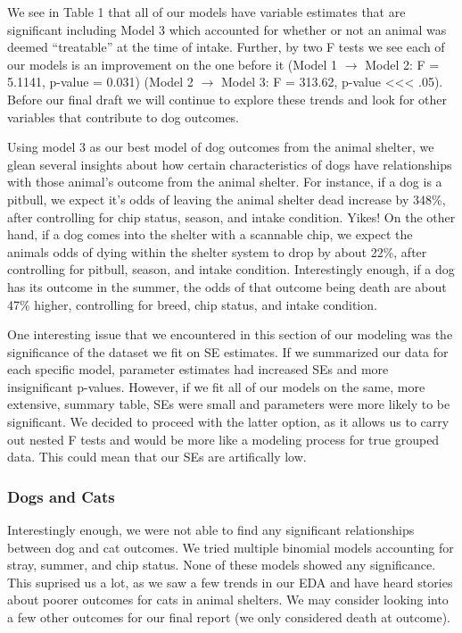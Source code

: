 \documentclass[]{article}
\begin{document}
We see in Table 1 that all of our models have variable estimates that
are significant including Model 3 which accounted for whether or not an
animal was deemed ``treatable'' at the time of intake. Further, by two F
tests we see each of our models is an improvement on the one before it
(Model 1 \(\rightarrow\) Model 2: F = 5.1141, p-value = 0.031) (Model 2
\(\rightarrow\) Model 3: F = 313.62, p-value
\textless{}\textless{}\textless{} .05). Before our final draft we will
continue to explore these trends and look for other variables that
contribute to dog outcomes.

Using model 3 as our best model of dog outcomes from the animal shelter,
we glean several insights about how certain characteristics of dogs have
relationships with those animal's outcome from the animal shelter. For
instance, if a dog is a pitbull, we expect it's odds of leaving the
animal shelter dead increase by 348\%, after controlling for chip
status, season, and intake condition. Yikes! On the other hand, if a dog
comes into the shelter with a scannable chip, we expect the animals odds
of dying within the shelter system to drop by about 22\%, after
controlling for pitbull, season, and intake condition. Interestingly
enough, if a dog has its outcome in the summer, the odds of that outcome
being death are about 47\% higher, controlling for breed, chip status,
and intake condition.

One interesting issue that we encountered in this section of our
modeling was the significance of the dataset we fit on SE estimates. If
we summarized our data for each specific model, parameter estimates had
increased SEs and more insignificant p-values. However, if we fit all of
our models on the same, more extensive, summary table, SEs were small
and parameters were more likely to be significant. We decided to proceed
with the latter option, as it allows us to carry out nested F tests and
would be more like a modeling process for true grouped data. This could
mean that our SEs are artifically low.

\subsubsection{Dogs and Cats}\label{dogs-and-cats}

Interestingly enough, we were not able to find any significant
relationships between dog and cat outcomes. We tried multiple binomial
models accounting for stray, summer, and chip status. None of these
models showed any significance. This suprised us a lot, as we saw a few
trends in our EDA and have heard stories about poorer outcomes for cats
in animal shelters. We may consider looking into a few other outcomes
for our final report (we only considered death at outcome).
\end{document}
